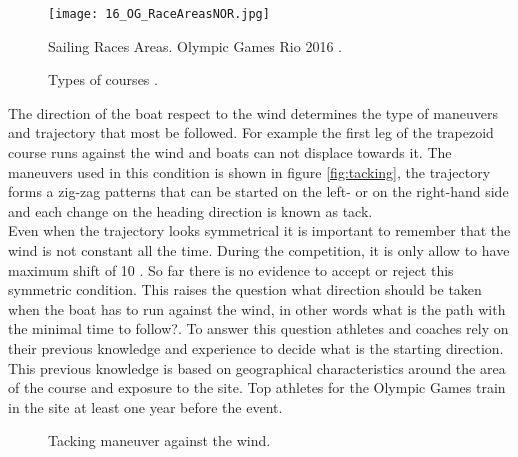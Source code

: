 \begin{figure}[ht]
\centering
 \texttt{[image: 16\_OG\_RaceAreasNOR.jpg]}
  \caption{Sailing Races Areas. Olympic Games Rio 2016 \cite{instr_rio}.}
\label{fig:olymp_areas_rio} 
\end{figure}

\begin{figure}[ht]
  \centering
  \hfill
  \caption{Types of courses \cite{instr_rio}.}
\label{fig:typecourses} 
\end{figure}

The direction of the boat respect to the wind determines the type of maneuvers and trajectory that most be followed. For example the first leg of the trapezoid course runs against the wind and boats can not displace towards it. The maneuvers used in this condition is shown in figure \ref{fig:tacking}, the trajectory forms a zig-zag patterns that can be started on the left- or on the right-hand side and each change on the heading direction is known as tack. \\

Even when the trajectory looks symmetrical it is important to remember that the wind is not constant all the time. During the competition, it is only allow to have maximum shift of 10 \degree \cite{race_pol}. So far there is no evidence to accept or reject this symmetric condition. This raises the question what direction should be taken when the boat has to run against the wind, in other words what is the path with the minimal time to follow?. To answer this question athletes and coaches rely on their previous knowledge and experience to decide what is the starting direction. This previous knowledge is based on geographical characteristics around the area of the course and exposure to the site. Top athletes for the Olympic Games train in the site at least one year before the event.
\begin{figure}[ht]
  \centering
  \hfill
   \centering
  \caption{Tacking maneuver against the wind.}
\label{fig:tack_against_wind} 
\end{figure}
\\
